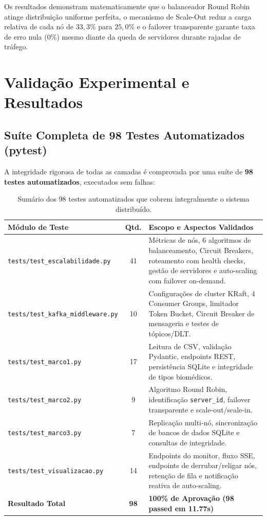 \documentclass[12pt,a4paper]{article}
\begin{document}
Os resultados demonstram matematicamente que o balanceador Round Robin atinge distribuição uniforme perfeita, o mecanismo de Scale-Out reduz a carga relativa de cada nó de $33{,}3\%$ para $25{,}0\%$ e o failover transparente garante taxa de erro nula ($0\%$) mesmo diante da queda de servidores durante rajadas de tráfego.

\section{Validação Experimental e Resultados}

\subsection{Suíte Completa de 98 Testes Automatizados (pytest)}
A integridade rigorosa de todas as camadas é comprovada por uma suíte de \textbf{98 testes automatizados}, executados sem falhas:

\begin{table}[H]
	\centering
	\small
	\begin{tabularx}{\textwidth}{l c X}
		\toprule
		\textbf{Módulo de Teste} & \textbf{Qtd.} & \textbf{Escopo e Aspectos Validados} \\
		\midrule
		\texttt{tests/test\_escalabilidade.py} & 41 & Métricas de nós, 6 algoritmos de balanceamento, Circuit Breakers, roteamento com health checks, gestão de servidores e auto-scaling com failover on-demand. \\
		\texttt{tests/test\_kafka\_middleware.py} & 10 & Configurações de cluster KRaft, 4 Consumer Groups, limitador Token Bucket, Circuit Breaker de mensageria e testes de tópicos/DLT. \\
		\texttt{tests/test\_marco1.py} & 17 & Leitura de CSV, validação Pydantic, endpoints REST, persistência SQLite e integridade de tipos biomédicos. \\
		\texttt{tests/test\_marco2.py} & 9 & Algoritmo Round Robin, identificação \texttt{server\_id}, failover transparente e scale-out/scale-in. \\
		\texttt{tests/test\_marco3.py} & 7 & Replicação multi-nó, sincronização de bancos de dados SQLite e consultas de integridade. \\
		\texttt{tests/test\_visualizacao.py} & 14 & Endpoints do monitor, fluxo SSE, endpoints de derrubar/religar nós, retenção de fila e notificação reativa de auto-scaling. \\
		\midrule
		\textbf{Resultado Total} & \textbf{98} & \textbf{100\% de Aprovação (98 passed em 11.77s)} \\
		\bottomrule
	\end{tabularx}
	\caption{Sumário dos 98 testes automatizados que cobrem integralmente o sistema distribuído.}
	\label{tab:pytest}
\end{table}
\end{document}
